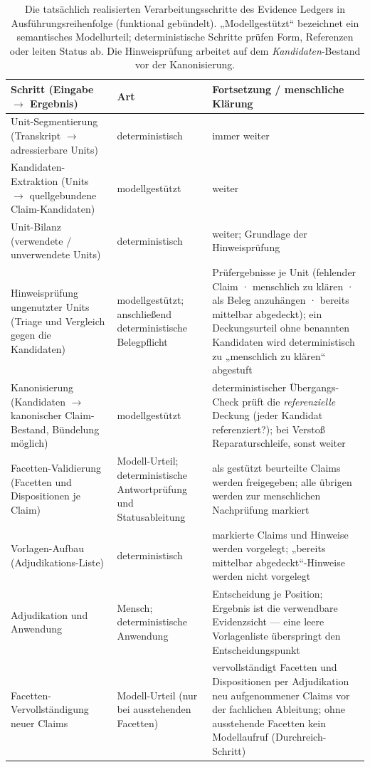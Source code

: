 \begin{table}[htbp]
  \centering
  \small
  \begin{tabular}{>{\raggedright\arraybackslash}p{}>{\raggedright\arraybackslash}p{}>{\raggedright\arraybackslash}p{}}
    \hline
    \textbf{Schritt (Eingabe $\rightarrow$ Ergebnis)} & \textbf{Art} & \textbf{Fortsetzung / menschliche Klärung} \\
    \hline
    Unit-Segmentierung (Transkript $\rightarrow$ adressierbare Units) & deterministisch & immer weiter \\
    Kandidaten-Extraktion (Units $\rightarrow$ quellgebundene Claim-Kandidaten) & modellgestützt & weiter \\
    Unit-Bilanz (verwendete / unverwendete Units) & deterministisch & weiter; Grundlage der Hinweisprüfung \\
    Hinweisprüfung ungenutzter Units (Triage und Vergleich gegen die Kandidaten) & modellgestützt; anschließend deterministische Belegpflicht & Prüfergebnisse je Unit (fehlender Claim · menschlich zu klären · als Beleg anzuhängen · bereits mittelbar abgedeckt); ein Deckungsurteil ohne benannten Kandidaten wird deterministisch zu „menschlich zu klären`` abgestuft \\
    Kanonisierung (Kandidaten $\rightarrow$ kanonischer Claim-Bestand, Bündelung möglich) & modellgestützt & deterministischer Übergangs-Check prüft die \emph{referenzielle} Deckung (jeder Kandidat referenziert?); bei Verstoß Reparaturschleife, sonst weiter \\
    Facetten-Validierung (Facetten und Dispositionen je Claim) & Modell-Urteil; deterministische Antwortprüfung und Statusableitung & als gestützt beurteilte Claims werden freigegeben; alle übrigen werden zur menschlichen Nachprüfung markiert \\
    Vorlagen-Aufbau (Adjudikations-Liste) & deterministisch & markierte Claims und Hinweise werden vorgelegt; „bereits mittelbar abgedeckt``-Hinweise werden nicht vorgelegt \\
    Adjudikation und Anwendung & Mensch; deterministische Anwendung & Entscheidung je Position; Ergebnis ist die verwendbare Evidenzsicht --- eine leere Vorlagenliste überspringt den Entscheidungspunkt \\
    Facetten-Vervollständigung neuer Claims & Modell-Urteil (nur bei ausstehenden Facetten) & vervollständigt Facetten und Dispositionen per Adjudikation neu aufgenommener Claims vor der fachlichen Ableitung; ohne ausstehende Facetten kein Modellaufruf (Durchreich-Schritt) \\
    \hline
  \end{tabular}
  \caption[Verarbeitungsschritte des Evidence Ledgers]{Die tatsächlich realisierten Verarbeitungsschritte des
    Evidence Ledgers in Ausführungsreihenfolge (funktional gebündelt).
    „Modellgestützt`` bezeichnet ein semantisches Modellurteil;
    deterministische Schritte prüfen Form, Referenzen oder leiten
    Status ab. Die Hinweisprüfung arbeitet auf dem
    \emph{Kandidaten}-Bestand vor der Kanonisierung.}
  \label{t:ledger-schritte}
\end{table}
